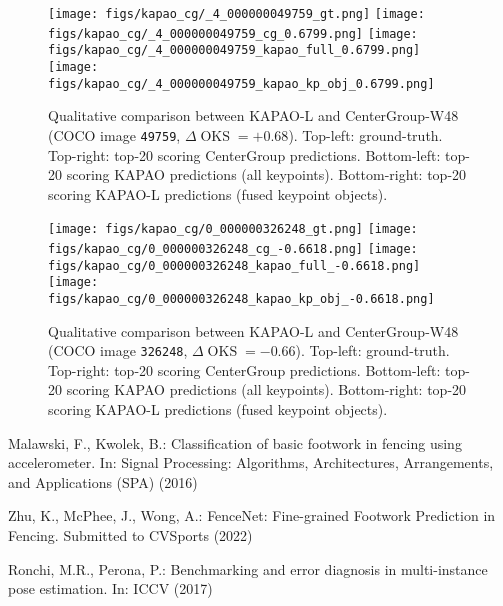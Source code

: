 \documentclass[runningheads]{llncs}
\DeclareMathOperator*{\oks}{OKS}
\begin{document}
\begin{figure}[t!]
\centering
    \texttt{[image: figs/kapao\_cg/\_4\_000000049759\_gt.png]}
    \texttt{[image: figs/kapao\_cg/\_4\_000000049759\_cg\_0.6799.png]}
    \texttt{[image: figs/kapao\_cg/\_4\_000000049759\_kapao\_full\_0.6799.png]}
    \texttt{[image: figs/kapao\_cg/\_4\_000000049759\_kapao\_kp\_obj\_0.6799.png]}
\caption[Qualitative comparison between KAPAO-L and CenterGroup-W48 (COCO image \texttt{49759}).]{Qualitative comparison between KAPAO-L and CenterGroup-W48 (COCO image \texttt{49759}, $\Delta\oks=+0.68$). Top-left: ground-truth. Top-right: top-20 scoring CenterGroup predictions. Bottom-left: top-20 scoring KAPAO predictions (all keypoints). Bottom-right: top-20 scoring KAPAO-L predictions (fused keypoint objects).}
\label{fig:kapao_qualitative_pos}
\end{figure}

\begin{figure}[t!]
\centering
    \texttt{[image: figs/kapao\_cg/0\_000000326248\_gt.png]}
    \texttt{[image: figs/kapao\_cg/0\_000000326248\_cg\_-0.6618.png]}
    \texttt{[image: figs/kapao\_cg/0\_000000326248\_kapao\_full\_-0.6618.png]}
    \texttt{[image: figs/kapao\_cg/0\_000000326248\_kapao\_kp\_obj\_-0.6618.png]}
\caption[Qualitative comparison between KAPAO-L and CenterGroup-W48 (COCO image \texttt{326248}).]{Qualitative comparison between KAPAO-L and CenterGroup-W48 (COCO image \texttt{326248}, $\Delta\oks=-0.66$). Top-left: ground-truth. Top-right: top-20 scoring CenterGroup predictions. Bottom-left: top-20 scoring KAPAO predictions (all keypoints). Bottom-right: top-20 scoring KAPAO-L predictions (fused keypoint objects).}
\label{fig:kapao_qualitative_neg}
\end{figure}

\begin{thebibliography}{2}
Malawski, F., Kwolek, B.: Classification of basic footwork in fencing using accelerometer. In: Signal Processing: Algorithms, Architectures, Arrangements, and
Applications (SPA) (2016)

Zhu, K., McPhee, J., Wong, A.: FenceNet: Fine-grained Footwork Prediction in Fencing. Submitted to CVSports (2022)

Ronchi, M.R., Perona, P.: Benchmarking and error diagnosis in multi-instance pose estimation. In: ICCV (2017)
\end{thebibliography}
\end{document}
